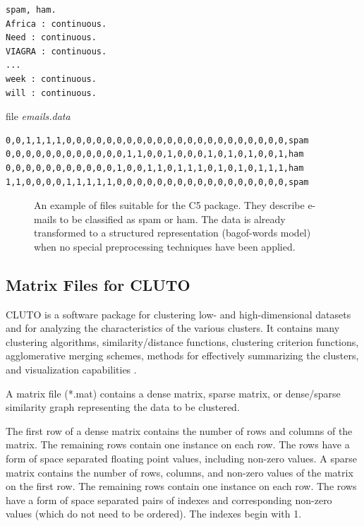 \begin{verbatim}
spam, ham.
Africa : continuous.
Need : continuous.
VIAGRA : continuous.
...
week : continuous.
will : continuous.
\end{verbatim}

\begin{center}
    file \textit{emails.data}
\end{center}

\begin{verbatim}
0,0,1,1,1,1,0,0,0,0,0,0,0,0,0,0,0,0,0,0,0,0,0,0,0,0,0,0,spam
0,0,0,0,0,0,0,0,0,0,0,0,1,1,0,0,1,0,0,0,1,0,1,0,1,0,0,1,ham
0,0,0,0,0,0,0,0,0,0,0,1,0,0,1,1,0,1,1,1,0,1,0,1,0,1,1,1,ham
1,1,0,0,0,0,1,1,1,1,1,0,0,0,0,0,0,0,0,0,0,0,0,0,0,0,0,0,spam
\end{verbatim}

\begin{figure}[H]
    \centering
    \caption{An example of files suitable for the C5 package. They describe e-mails to be
classified as spam or ham. The data is already transformed to a structured representation (bagof-words model) when no special preprocessing techniques have been applied.}
    \label{fig:placeholder315}
\end{figure}

\subsection{Matrix Files for CLUTO}

CLUTO is a software package for clustering low- and high-dimensional datasets
and for analyzing the characteristics of the various clusters. It contains many
clustering algorithms, similarity/distance functions, clustering criterion functions, agglomerative merging schemes, methods for effectively summarizing the
clusters, and visualization capabilities \cite{ref141}.

A matrix file (*.mat) contains a dense matrix, sparse matrix, or dense/sparse
similarity graph representing the data to be clustered.

The first row of a dense matrix contains the number of rows and columns of
the matrix. The remaining rows contain one instance on each row. The rows have
a form of space separated floating point values, including non-zero values. A
sparse matrix contains the number of rows, columns, and non-zero values of the
matrix on the first row. The remaining rows contain one instance on each row.
The rows have a form of space separated pairs of indexes and corresponding
non-zero values (which do not need to be ordered). The indexes begin with 1.


